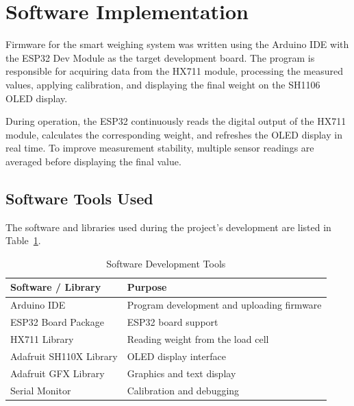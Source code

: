 \section{Software Implementation}

Firmware for the smart weighing system was written using the Arduino IDE with the ESP32 Dev Module as the target development board. The program is responsible for acquiring data from the HX711 module, processing the measured values, applying calibration, and displaying the final weight on the SH1106 OLED display.

During operation, the ESP32 continuously reads the digital output of the HX711 module, calculates the corresponding weight, and refreshes the OLED display in real time. To improve measurement stability, multiple sensor readings are averaged before displaying the final value.


\subsection{Software Tools Used}


The software and libraries used during the project's development are listed in Table~\ref{tab:software}. \cite{arduino_ide,hx711_library,adafruit_gfx,adafruit_sh110x}


\begin{table}[H]

\centering
\caption{Software Development Tools}
\label{tab:software}

\begin{tabular}{|p{6cm}|p{7cm}|}
\hline
\textbf{Software / Library} & \textbf{Purpose} \\
\hline
Arduino IDE & Program development and uploading firmware \\
ESP32 Board Package & ESP32 board support \\
HX711 Library & Reading weight from the load cell \\
Adafruit SH110X Library & OLED display interface \\
Adafruit GFX Library & Graphics and text display \\
Serial Monitor & Calibration and debugging \\
\hline
\end{tabular}

\end{table}


